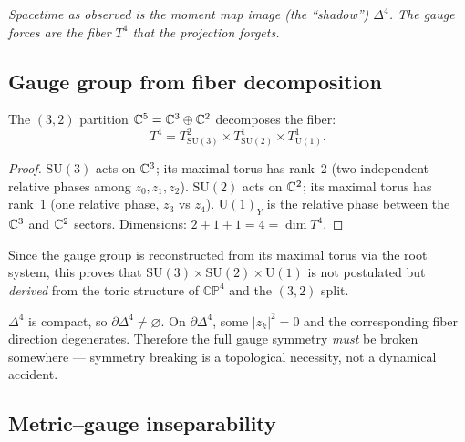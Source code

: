 \noindent
\textit{Spacetime as observed is the moment map image (the ``shadow'') $\Delta^4$.  The gauge forces are the fiber $T^4$ that the projection forgets.}

\subsection{Gauge group from fiber decomposition}
\label{sec:toric_gauge}

\begin{theorem}
\label{thm:torus_decomposition}
The $(3,2)$ partition $\mathbb{C}^5 = \mathbb{C}^3 \oplus \mathbb{C}^2$ decomposes the fiber:
\begin{equation}
T^4 = T^2_{\mathrm{SU}(3)} \times T^1_{\mathrm{SU}(2)} \times T^1_{\mathrm{U}(1)}.
\end{equation}
\end{theorem}

\begin{proof}
$\mathrm{SU}(3)$ acts on $\mathbb{C}^3$; its maximal torus has rank~2 (two independent relative phases among $z_0, z_1, z_2$).  $\mathrm{SU}(2)$ acts on $\mathbb{C}^2$; its maximal torus has rank~1 (one relative phase, $z_3$ vs $z_4$).  $\mathrm{U}(1)_Y$ is the relative phase between the $\mathbb{C}^3$ and $\mathbb{C}^2$ sectors.  Dimensions: $2 + 1 + 1 = 4 = \dim T^4$.
\end{proof}

Since the gauge group is reconstructed from its maximal torus via the root system, this proves that $\mathrm{SU}(3) \times \mathrm{SU}(2) \times \mathrm{U}(1)$ is not postulated but \emph{derived} from the toric structure of $\mathbb{CP}^4$ and the $(3,2)$ split.

\begin{corollary}
\label{cor:breaking}
$\Delta^4$ is compact, so $\partial\Delta^4 \neq \varnothing$.  On $\partial\Delta^4$, some $|z_k|^2 = 0$ and the corresponding fiber direction degenerates.  Therefore the full gauge symmetry \emph{must} be broken somewhere --- symmetry breaking is a topological necessity, not a dynamical accident.
\end{corollary}

\subsection{Metric--gauge inseparability}
\label{sec:inseparability}

